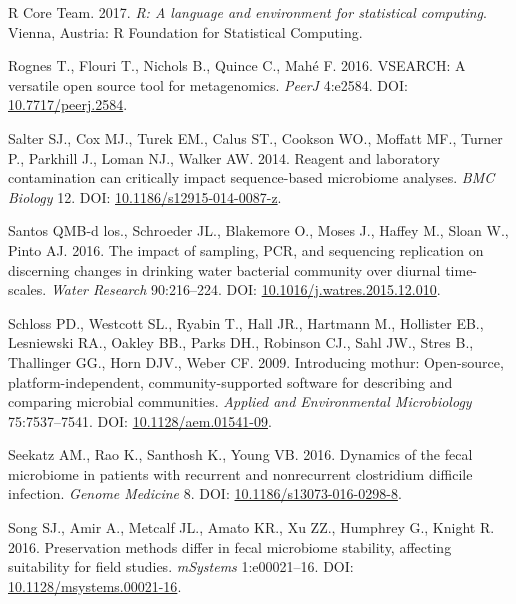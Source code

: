 \documentclass[12pt,]{article}
\begin{document}
\hypertarget{ref-r_citation_2017}{}
R Core Team. 2017. \emph{R: A language and environment for statistical
computing}. Vienna, Austria: R Foundation for Statistical Computing.

\hypertarget{ref-vsearch_Rognes_2016}{}
Rognes T., Flouri T., Nichols B., Quince C., Mahé F. 2016. VSEARCH: A
versatile open source tool for metagenomics. \emph{PeerJ} 4:e2584. DOI:
\href{https://doi.org/10.7717/peerj.2584}{10.7717/peerj.2584}.

\hypertarget{ref-contamination_Salter2014}{}
Salter SJ., Cox MJ., Turek EM., Calus ST., Cookson WO., Moffatt MF.,
Turner P., Parkhill J., Loman NJ., Walker AW. 2014. Reagent and
laboratory contamination can critically impact sequence-based microbiome
analyses. \emph{BMC Biology} 12. DOI:
\href{https://doi.org/10.1186/s12915-014-0087-z}{10.1186/s12915-014-0087-z}.

\hypertarget{ref-BautistadelosSantos2016}{}
Santos QMB-d los., Schroeder JL., Blakemore O., Moses J., Haffey M.,
Sloan W., Pinto AJ. 2016. The impact of sampling, PCR, and sequencing
replication on discerning changes in drinking water bacterial community
over diurnal time-scales. \emph{Water Research} 90:216--224. DOI:
\href{https://doi.org/10.1016/j.watres.2015.12.010}{10.1016/j.watres.2015.12.010}.

\hypertarget{ref-mothur_schloss_2009}{}
Schloss PD., Westcott SL., Ryabin T., Hall JR., Hartmann M., Hollister
EB., Lesniewski RA., Oakley BB., Parks DH., Robinson CJ., Sahl JW.,
Stres B., Thallinger GG., Horn DJV., Weber CF. 2009. Introducing mothur:
Open-source, platform-independent, community-supported software for
describing and comparing microbial communities. \emph{Applied and
Environmental Microbiology} 75:7537--7541. DOI:
\href{https://doi.org/10.1128/aem.01541-09}{10.1128/aem.01541-09}.

\hypertarget{ref-erin_seekatz_2016}{}
Seekatz AM., Rao K., Santhosh K., Young VB. 2016. Dynamics of the fecal
microbiome in patients with recurrent and nonrecurrent clostridium
difficile infection. \emph{Genome Medicine} 8. DOI:
\href{https://doi.org/10.1186/s13073-016-0298-8}{10.1186/s13073-016-0298-8}.

\hypertarget{ref-preservation_Song_2016}{}
Song SJ., Amir A., Metcalf JL., Amato KR., Xu ZZ., Humphrey G., Knight
R. 2016. Preservation methods differ in fecal microbiome stability,
affecting suitability for field studies. \emph{mSystems} 1:e00021--16.
DOI:
\href{https://doi.org/10.1128/msystems.00021-16}{10.1128/msystems.00021-16}.
\end{document}
